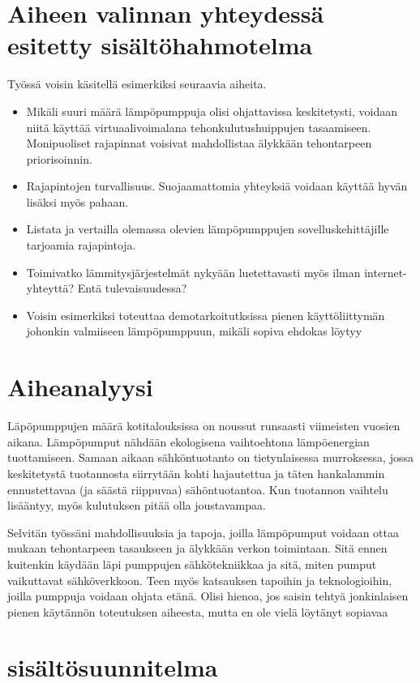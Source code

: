 \section{Aiheen valinnan yhteydessä esitetty sisältöhahmotelma}
  Työssä voisin käsitellä esimerkiksi seuraavia aiheita.
  \begin{itemize}
    \item  Mikäli suuri määrä lämpöpumppuja olisi ohjattavissa keskitetysti, voidaan niitä käyttää virtuaalivoimalana tehonkulutushuippujen tasaamiseen. Monipuoliset rajapinnat voisivat mahdollistaa älykkään tehontarpeen priorisoinnin.
    \item Rajapintojen turvallisuus. Suojaamattomia yhteyksiä voidaan käyttää hyvän lisäksi myös pahaan.
    \item Listata ja vertailla olemassa olevien lämpöpumppujen sovelluskehittäjille tarjoamia rajapintoja.
    \item  Toimivatko lämmitysjärjestelmät nykyään luetettavasti myös ilman internet-yhteyttä? Entä tulevaisuudessa?
    \item Voisin esimerkiksi toteuttaa demotarkoitutksissa pienen käyttöliittymän johonkin valmiiseen lämpöpumppuun, mikäli sopiva ehdokas löytyy
  \end{itemize}
\section{Aiheanalyysi}

  Läpöpumppujen määrä kotitalouksissa on noussut runsaasti viimeisten vuosien aikana. Lämpöpumput nähdään ekologisena vaihtoehtona lämpöenergian tuottamiseen. Samaan aikaan sähköntuotanto on tietynlaisessa murroksessa, jossa keskitetystä tuotannosta siirrytään kohti hajautettua ja täten hankalammin ennustettavaa (ja säästä riippuvaa) sähöntuotantoa. Kun tuotannon vaihtelu lisääntyy, myös kulutuksen pitää olla joustavampaa.

  Selvitän työssäni mahdollisuuksia ja tapoja, joilla lämpöpumput voidaan ottaa mukaan tehontarpeen tasaukseen ja älykkään verkon toimintaan. Sitä ennen kuitenkin käydään läpi pumppujen sähkötekniikkaa ja sitä, miten pumput vaikuttavat sähköverkkoon. Teen myös katsauksen tapoihin ja teknologioihin, joilla pumppuja voidaan ohjata etänä. Olisi hienoa, jos saisin tehtyä jonkinlaisen pienen käytännön toteutuksen aiheesta, mutta en ole vielä löytänyt sopiavaa 

\section{sisältösuunnitelma}

